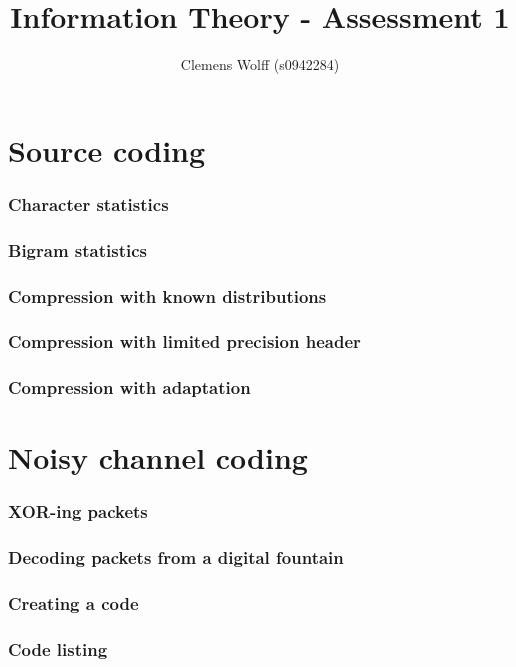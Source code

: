 \documentclass[10pt,a4paper,twoside,twocolumn]{article}
\title{Information Theory - Assessment 1}
\author{Clemens Wolff (s0942284)}
\date{\vspace{-2em}}
\begin{document}
\maketitle


\part{Source coding}

\section{Character statistics}
\section{Bigram statistics}
\section{Compression with known distributions}
\section{Compression with limited precision header}
\section{Compression with adaptation}


\part{Noisy channel coding}

\section{XOR-ing packets}
\section{Decoding packets from a digital fountain}
\section{Creating a code}


\onecolumn
\appendixpage
\appendix

\section{Code listing}
\end{document}
